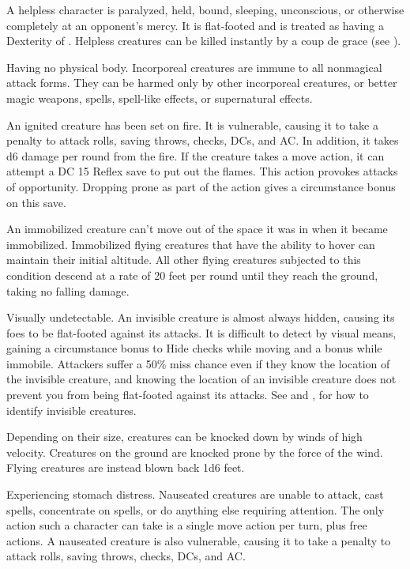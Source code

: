  A helpless character is paralyzed, held, bound, sleeping, unconscious, or otherwise completely at an opponent's mercy. It is flat-footed and is treated as having a Dexterity of . Helpless creatures can be killed instantly by a coup de grace (see ).

 Having no physical body. Incorporeal creatures are immune to all nonmagical attack forms. They can be harmed only by other incorporeal creatures,  or better magic weapons, spells, spell-like effects, or supernatural effects.

 An ignited creature has been set on fire. It is vulnerable, causing it to take a  penalty to attack rolls, saving throws, checks, DCs, and AC. In addition, it takes d6 damage per round from the fire. If the creature takes a move action, it can attempt a DC 15 Reflex save to put out the flames. This action provokes attacks of opportunity. Dropping prone as part of the action gives a  circumstance bonus on this save.

 An immobilized creature can't move out of the space it was in when it became immobilized. Immobilized flying creatures that have the ability to hover can maintain their initial altitude. All other flying creatures subjected to this condition descend at a rate of 20 feet per round until they reach the ground, taking no falling damage.

 Visually undetectable. An invisible creature is almost always hidden, causing its foes to be flat-footed against its attacks. It is difficult to detect by visual means, gaining a  circumstance bonus to Hide checks while moving and a  bonus while immobile. Attackers suffer a 50\% miss chance even if they know the location of the invisible creature, and knowing the location of an invisible creature does not prevent you from being flat-footed against its attacks. See  and , for how to identify invisible creatures.

 Depending on their size, creatures can be knocked down by winds of high velocity. Creatures on the ground are knocked prone by the force of the wind. Flying creatures are instead blown back 1d6  feet.

 Experiencing stomach distress. Nauseated creatures are unable to attack, cast spells, concentrate on spells, or do anything else requiring attention. The only action such a character can take is a single move action per turn, plus free actions. A nauseated creature is also vulnerable, causing it to take a  penalty to attack rolls, saving throws, checks, DCs, and AC.


